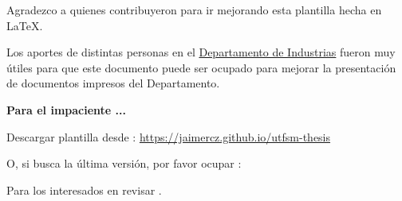 
	Agradezco a quienes contribuyeron para ir mejorando esta plantilla hecha en \LaTeX{}. 
    
    Los aportes de distintas personas en el \href{http://www.industrias.usm.cl}{Departamento de Industrias} fueron muy útiles para que este documento puede ser ocupado para mejorar la presentación de documentos impresos del Departamento.


\vspace{20mm}
\begin{framed}
\noindent\textbf{\color{red}Para el impaciente ...}

Descargar plantilla desde : \url{https://jaimercz.github.io/utfsm-thesis}
	
    
\noindent O, si busca la última versión, por favor ocupar :


Para los interesados en  revisar \citet{git2016}.


\end{framed}
